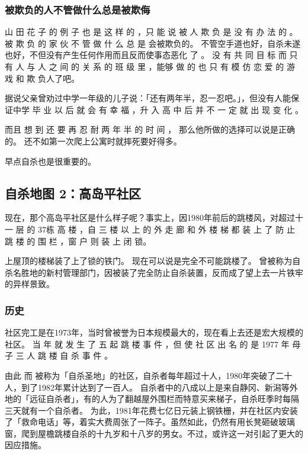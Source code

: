 \documentclass[UTF8]{ctexart}
\begin{document}
\subsubsection*{被欺负的人不管做什么总是被欺侮}

 山 田 花 子 的 例 子 也 是 这 样 的 ，只 能 说 被 人 欺 负 是 没 有 办 法 的 。
被 欺 负 的 家 伙 不 管 做 什 么 总 是 会被欺负的。
不管空手道也好，自杀未遂也好，不但没有产生任何作用而且反而使事态恶化 了 。
没 有 共 同 目 标 而 只 有 人 与 人 之 间 的 关 系 的 班 级 里 ，能够 做 的 也 只 有 模 仿 恋 爱 的 游 戏 和 欺 负人了吧。

据说父亲曾劝过中学一年级的儿子说：「还有两年半，忍一忍吧。」，但没有人能保证中学 毕 业 以 后 就 会 有 幸 福 ，升 入 高 中 后 并 不 一 定 就 出 现 变 化 。

而且 想 到 还 要 再 忍 耐 两 年 半 的 时 间 ， 那么他所做的选择可以说是正确的。
还不如第一次爬上公寓时就摔死要好得多。 

早点自杀也是很重要的。

\subsection{自杀地图 2：高岛平社区}

现在，那个高岛平社区是什么样子呢？事实上，因1980年前后的跳楼风，对超过十一 层 的 $37$栋 高 楼 ，自 三 楼 以 上 的 外 走 廊 和 外 楼 梯 都 装 上 了 防 止 跳 楼 的 围 栏 ，窗 户 则 装 上 闭 锁。

上屋顶的楼梯装了上了锁的铁门。
现在可以说是完全不可能跳楼了。
曾被称为自杀名胜地的新村管理部门，因被装了完全防止自杀装置，反而成了望上去一片铁牢的异样景致。

\subsubsection{历史}

社区完工是在1973年，当时曾被誉为日本规模最大的，现在看上去还是宏大规模的社区。 
当 年 就 发 生 了 五 起 跳 楼 事 件 ，但 使 社 区 出 名 的 是 1977 年 母 子 三 人 跳 楼 自 杀 事 件 。

由此 而 被称为「自杀圣地」的社区，自杀者每年超过十人，1980年突破了二十人，到了1982年累计达到了一百人。 
自杀者中的八成以上是来自静冈、新潟等外地的「远征自杀者」，有的人为了翻越屋外围栏而特意买来梯子，自杀旺季时每隔三天就有一个自杀者。
为此，1981年花费七亿日元装上钢铁栅，并在社区内安装了「救命电话」等，着实大费周张了一阵子。虽然如此，仍然有用长凳砸破玻璃窗，爬到屋檐跳楼自杀的十九岁和十八岁的男女。不过，或许这一对引起了更大的因应措施。
\end{document}
